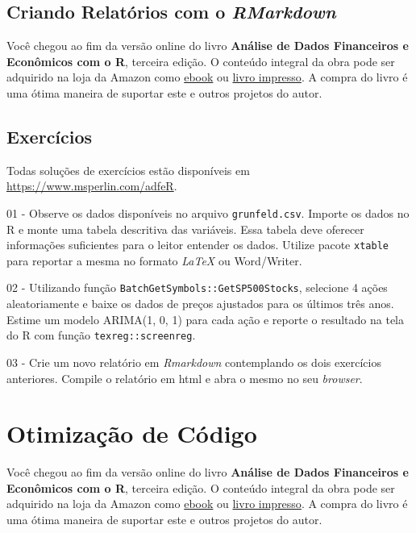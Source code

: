 \documentclass[
  11pt,
]{book}
\newenvironment{pleasebuyit}
{\begin{noteblock}
		
	} {\end{noteblock}}
\begin{document}
\hypertarget{criando-relatuxf3rios-com-o-rmarkdown}{%
\section{\texorpdfstring{Criando Relatórios com o \emph{RMarkdown}}{Criando Relatórios com o RMarkdown}}\label{criando-relatuxf3rios-com-o-rmarkdown}}

\begin{pleasebuyit}
Você chegou ao fim da versão online do livro \textbf{Análise de Dados
Financeiros e Econômicos com o R}, terceira edição. O conteúdo integral
da obra pode ser adquirido na loja da Amazon como
\href{https://www.amazon.com.br/dp/B08WNC27ZY}{ebook} ou
\href{https://www.amazon.com/dp/B08WP8CCDB}{livro impresso}. A compra do
livro é uma ótima maneira de suportar este e outros projetos do autor.
\end{pleasebuyit}

\hypertarget{exerc-reportando-resultados}{%
\section{Exercícios}\label{exerc-reportando-resultados}}

Todas soluções de exercícios estão disponíveis em \url{https://www.msperlin.com/adfeR}.

01 -
Observe os dados disponíveis no arquivo \texttt{grunfeld.csv}. Importe os dados no R e monte uma tabela descritiva das variáveis. Essa tabela deve oferecer informações suficientes para o leitor entender os dados. Utilize pacote \texttt{xtable} para reportar a mesma no formato \emph{LaTeX} ou Word/Writer.

02 -
Utilizando função \texttt{BatchGetSymbols::GetSP500Stocks}, selecione 4 ações aleatoriamente e baixe os dados de preços ajustados para os últimos três anos. Estime um modelo ARIMA(1, 0, 1) para cada ação e reporte o resultado na tela do R com função \texttt{texreg::screenreg}.

03 -
Crie um novo relatório em \emph{Rmarkdown} contemplando os dois exercícios anteriores. Compile o relatório em html e abra o mesmo no seu \emph{browser}.

\hypertarget{otimizacao}{%
\chapter{Otimização de Código}\label{otimizacao}}

\begin{pleasebuyit}
Você chegou ao fim da versão online do livro \textbf{Análise de Dados
Financeiros e Econômicos com o R}, terceira edição. O conteúdo integral
da obra pode ser adquirido na loja da Amazon como
\href{https://www.amazon.com.br/dp/B08WNC27ZY}{ebook} ou
\href{https://www.amazon.com/dp/B08WP8CCDB}{livro impresso}. A compra do
livro é uma ótima maneira de suportar este e outros projetos do autor.
\end{pleasebuyit}
\end{document}
